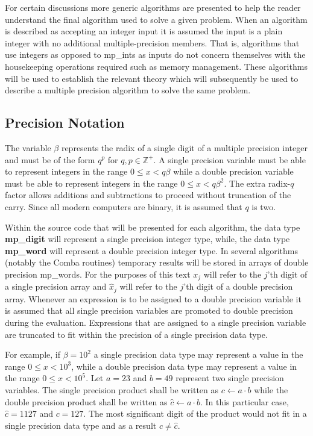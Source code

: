 \documentclass[b5paper]{book}
\def\Z{{\mathbb Z}}
\begin{document}
For certain discussions more generic algorithms are presented to help the reader understand the final algorithm used
to solve a given problem.  When an algorithm is described as accepting an integer input it is assumed the input is 
a plain integer with no additional multiple-precision members.  That is, algorithms that use integers as opposed to 
mp\_ints as inputs do not concern themselves with the housekeeping operations required such as memory management.  These 
algorithms will be used to establish the relevant theory which will subsequently be used to describe a multiple
precision algorithm to solve the same problem.  

\subsection{Precision Notation}
The variable $\beta$ represents the radix of a single digit of a multiple precision integer and 
must be of the form $q^p$ for $q, p \in \Z^+$.  A single precision variable must be able to represent integers in 
the range $0 \le x < q \beta$ while a double precision variable must be able to represent integers in the range 
$0 \le x < q \beta^2$.  The extra radix-$q$ factor allows additions and subtractions to proceed without truncation of the 
carry.  Since all modern computers are binary, it is assumed that $q$ is two.

 
Within the source code that will be presented for each algorithm, the data type \textbf{mp\_digit} will represent 
a single precision integer type, while, the data type \textbf{mp\_word} will represent a double precision integer type.  In 
several algorithms (notably the Comba routines) temporary results will be stored in arrays of double precision mp\_words.  
For the purposes of this text $x_j$ will refer to the $j$'th digit of a single precision array and $\hat x_j$ will refer to 
the $j$'th digit of a double precision array.  Whenever an expression is to be assigned to a double precision
variable it is assumed that all single precision variables are promoted to double precision during the evaluation.  
Expressions that are assigned to a single precision variable are truncated to fit within the precision of a single
precision data type.

For example, if $\beta = 10^2$ a single precision data type may represent a value in the 
range $0 \le x < 10^3$, while a double precision data type may represent a value in the range $0 \le x < 10^5$.  Let
$a = 23$ and $b = 49$ represent two single precision variables.  The single precision product shall be written
as $c \leftarrow a \cdot b$ while the double precision product shall be written as $\hat c \leftarrow a \cdot b$.
In this particular case, $\hat c = 1127$ and $c = 127$.  The most significant digit of the product would not fit 
in a single precision data type and as a result $c \ne \hat c$.  
\end{document}
